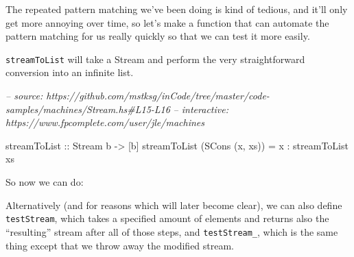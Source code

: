 \documentclass[]{article}
\newenvironment{Shaded}{}{}
\newcommand{\CommentTok}[1]{\textcolor[rgb]{0.38,0.63,0.69}{\textit{#1}}}
\newcommand{\DataTypeTok}[1]{\textcolor[rgb]{0.56,0.13,0.00}{#1}}
\newcommand{\DecValTok}[1]{\textcolor[rgb]{0.25,0.63,0.44}{#1}}
\newcommand{\FunctionTok}[1]{\textcolor[rgb]{0.02,0.16,0.49}{#1}}
\newcommand{\NormalTok}[1]{#1}
\newcommand{\OtherTok}[1]{\textcolor[rgb]{0.00,0.44,0.13}{#1}}
\begin{document}
The repeated pattern matching we've been doing is kind of tedious, and it'll
only get more annoying over time, so let's make a function that can automate the
pattern matching for us really quickly so that we can test it more easily.

\texttt{streamToList} will take a Stream and perform the very straightforward
conversion into an infinite list.

\begin{Shaded}
\begin{Highlighting}[]
\CommentTok{-- source: https://github.com/mstksg/inCode/tree/master/code-samples/machines/Stream.hs#L15-L16}
\CommentTok{-- interactive: https://www.fpcomplete.com/user/jle/machines}

\OtherTok{streamToList ::} \DataTypeTok{Stream}\NormalTok{ b }\OtherTok{->}\NormalTok{ [b]}
\NormalTok{streamToList (}\DataTypeTok{SCons}\NormalTok{ (x, xs)) }\FunctionTok{=}\NormalTok{ x }\FunctionTok{:}\NormalTok{ streamToList xs}
\end{Highlighting}
\end{Shaded}

So now we can do:

\begin{Shaded}
\end{Shaded}

Alternatively (and for reasons which will later become clear), we can also
define \texttt{testStream}, which takes a specified amount of elements and
returns also the ``resulting'' stream after all of those steps, and
\texttt{testStream\_}, which is the same thing except that we throw away the
modified stream.
\end{document}
